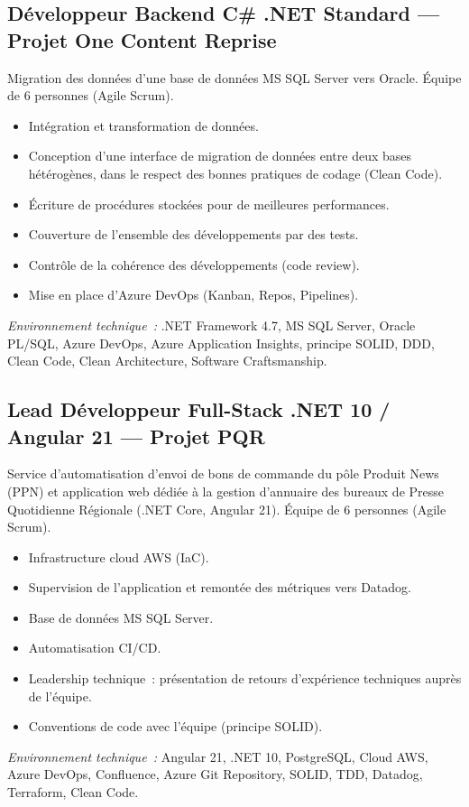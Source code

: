 \documentclass[10pt,a4paper]{article}
\begin{document}
\vspace{6pt}

\subsection*{Développeur Backend C\# .NET Standard --- Projet One Content Reprise}
\color{darkgray}
Migration des données d'une base de données MS SQL Server vers Oracle. Équipe de 6 personnes (Agile Scrum).
\begin{itemize}
  \item Intégration et transformation de données.
  \item Conception d'une interface de migration de données entre deux bases hétérogènes, dans le respect des bonnes pratiques de codage (Clean Code).
  \item Écriture de procédures stockées pour de meilleures performances.
  \item Couverture de l'ensemble des développements par des tests.
  \item Contrôle de la cohérence des développements (code review).
  \item Mise en place d'Azure DevOps (Kanban, Repos, Pipelines).
\end{itemize}
\textit{Environnement technique~:} .NET Framework 4.7, MS SQL Server, Oracle PL/SQL, Azure DevOps, Azure Application Insights, principe SOLID, DDD, Clean Code, Clean Architecture, Software Craftsmanship.

\vspace{6pt}

\subsection*{Lead Développeur Full-Stack .NET 10 / Angular 21 --- Projet PQR}
\color{darkgray}
Service d'automatisation d'envoi de bons de commande du pôle Produit News (PPN) et application web dédiée à la gestion d'annuaire des bureaux de Presse Quotidienne Régionale (.NET Core, Angular 21). Équipe de 6 personnes (Agile Scrum).
\begin{itemize}
  \item Infrastructure cloud AWS (IaC).
  \item Supervision de l'application et remontée des métriques vers Datadog.
  \item Base de données MS SQL Server.
  \item Automatisation CI/CD.
  \item Leadership technique~: présentation de retours d'expérience techniques auprès de l'équipe.
  \item Conventions de code avec l'équipe (principe SOLID).
\end{itemize}
\textit{Environnement technique~:} Angular 21, .NET 10, PostgreSQL, Cloud AWS, Azure DevOps, Confluence, Azure Git Repository, SOLID, TDD, Datadog, Terraform, Clean Code.
\end{document}
